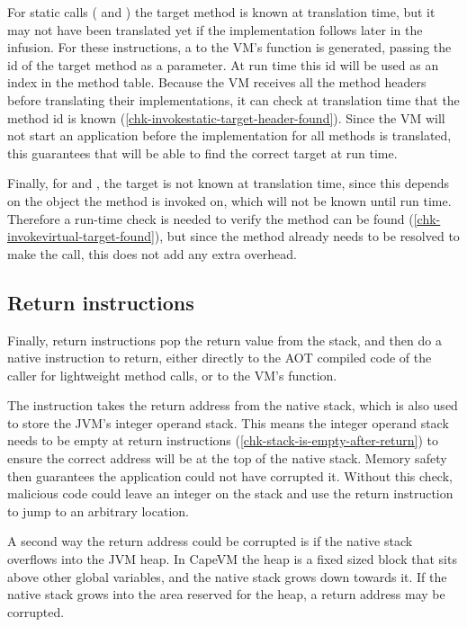 For static calls ( and ) the target method is known at translation time, but it may not have been translated yet if the implementation follows later in the infusion. For these instructions, a  to the VM's  function is generated, passing the id of the target method as a parameter. At run time this id will be used as an index in the method table. Because the VM receives all the method headers before translating their implementations, it can check at translation time that the method id is known (\ref{chk-invokestatic-target-header-found}). Since the VM will not start an application before the implementation for all methods is translated, this guarantees that  will be able to find the correct target at run time.

Finally, for  and , the target is not known at translation time, since this depends on the object the method is invoked on, which will not be known until run time. Therefore a run-time check is needed to verify the method can be found (\ref{chk-invokevirtual-target-found}), but since the method already needs to be resolved to make the call, this does not add any extra overhead.

\subsection{Return instructions}
\label{sec-control-flow-safety-return-instructions}
Finally, return instructions pop the return value from the stack, and then do a native  instruction to return, either directly to the AOT compiled code of the caller for lightweight method calls, or to the VM's  function.

The  instruction takes the return address from the native stack, which is also used to store the JVM's integer operand stack. This means the integer operand stack needs to be empty at return instructions (\ref{chk-stack-is-empty-after-return}) to ensure the correct address will be at the top of the native stack. Memory safety then guarantees the application could not have corrupted it. Without this check, malicious code could leave an integer on the stack and use the return instruction to jump to an arbitrary location.

A second way the return address could be corrupted is if the native stack overflows into the JVM heap. In CapeVM the heap is a fixed sized block that sits above other global variables, and the native stack grows down towards it. If the native stack grows into the area reserved for the heap, a return address may be corrupted.

